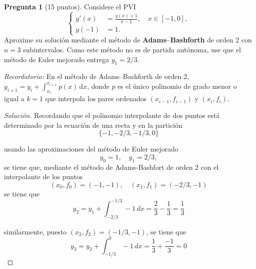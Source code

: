 \documentclass[letterpaper,12pt]{article}
\theoremstyle{definition}
\newtheorem{question}{Pregunta}
\numberwithin{equation}{question}
\newenvironment{solution}{\begin{proof}[Solución]}{\end{proof}}
\begin{document}
\newpage

\begin{question}[15 puntos]
Considere el PVI
%
\begin{equation}\label{PVI-2}
\left\{\begin{aligned}
y'(x) & = \frac{y(x)+1}{x-1}, \quad x \in [-1,0],\\
y(-1) & = 1.
\end{aligned}\right.
\end{equation}
%
Aproxime su solución mediante el método de \textbf{Adams--Bashforth} de orden $2$ con $n = 3$ subintervalos.
Como este método no es de partida autónoma, use que el método de Euler mejorado entrega $y_1 = 2/3$.

\emph{Recordatorio:} En el método de Adams--Bashforth de orden 2, $y_{i+1} = y_i + \int_{x_i}^{x_{i+1}} p(x) \, \mathrm{d} x$, donde $p$ es el único polinomio de grado menor o igual a $k = 1$ que interpola los pares ordenados $(x_{i-1}, f_{i-1})$ y $(x_i, f_i)$.
\begin{solution}
Recordando que el polinomio interpolante de dos puntos est\'a determinado por la ecuaci\'on de una recta  y en la partici\'on
$$
\{-1,-2/3,-1/3,0\}
$$
\hfill{}

usando las aproximaciones del m\'etodo de Euler mejorado
$$
y_0=1, \quad y_1=2/3,
$$
se tiene que, mediante el m\'etodo de Adams-Bashfort de orden 2 con el interpolante de los puntos
$$
(x_0,f_0)=(-1,-1), \quad (x_1,f_1)=(-2/3,-1)
$$
se tiene que
$$
y_2	=y_1+\int_{-2/3}^{-1/3} -1 \,dx
	=\frac{2}{3}-\frac{1}{3}=\frac{1}{3}
$$
\hfill{}

similarmente, puesto $(x_2,f_2)=(-1/3,-1)$, se tiene que
$$
y_3	=y_2+\int_{-1/3}^{0} -1\,dx
	=\frac{1}{3}+\frac{-1}{3}=0
$$
\hfill{}

\end{solution}
\end{question}

\newpage
\end{document}
